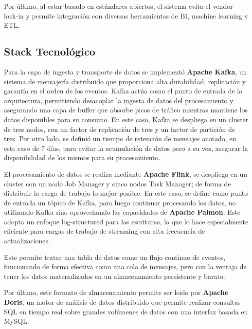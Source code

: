 Por último, al estar basado en estándares abiertos, el sistema evita el vendor lock-in 
y permite integración con diversas herramientas de BI, machine learning y ETL.

\newpage
\subsection{Stack Tecnológico}
Para la capa de ingesta y transporte de datos se implementó \textbf{Apache Kafka}, 
un sistema de mensajería distribuido que proporciona alta durabilidad, replicación y garantía en el orden de los eventos. 
Kafka actúa como el punto de entrada de la arquitectura, permitiendo desacoplar la ingesta de datos del procesamiento 
y asegurando una capa de buffer que absorbe picos de tráfico mientras mantiene los datos disponibles para su consumo.
En este caso, Kafka se despliega en un cluster de tres nodos, con un factor de replicación de tres y un factor de partición de tres.
Por otro lado, se definió un tiempo de retención de mensajes acotado, en este caso de 7 días, para evitar la acumulación de datos
pero a su vez, asegurar la disponibilidad de los mismos para su procesamiento.\newline

El procesamiento de datos se realiza mediante \textbf{Apache Flink}, se despliega en un cluster con un nodo Job Manager 
y cinco nodos Task Manager; de forma de distribuir la carga de trabajo lo mejor posible.
En este caso, se define como punto de entrada un tópico de Kafka, para luego continuar procesando los datos, 
no utilizando Kafka sino aprovechando las capacidades de \textbf{Apache Paimon}. 
Este adopta un enfoque log-structured para las escrituras, 
lo que lo hace especialmente eficiente para cargas de trabajo de streaming con alta frecuencia de actualizaciones.\newline

Este permite tratar una tabla de datos como un flujo continuo de eventos, funcionando de forma efectiva como 
una cola de mensajes, pero con la ventaja de tener los datos materializados en un almacenamiento persistente y barato.\newline

Por último, este formato de almacenamiento permite ser leido por \textbf{Apache Doris}, un motor de análisis de datos
distribuido que permite realizar consultas SQL en tiempo real sobre grandes volúmenes de datos con una interfaz basada en MySQL.\newline

